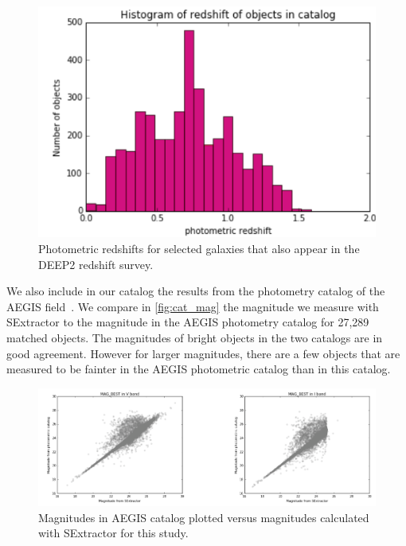 \documentclass[a4paper,11pt]{article}
\begin{document}
\begin{figure}[h]
\centering\includegraphics[width=0.7\linewidth]{redshift.png}
\caption{Photometric redshifts for selected galaxies that also appear in the DEEP2 redshift survey.}
\label{fig:redshift}
\end{figure}
We also include in our catalog the results from the photometry catalog of the AEGIS field~\citep{Lotz2008}. 
We compare in \autoref{fig:cat_mag} the magnitude we measure with SExtractor to the magnitude in the AEGIS photometry catalog for 27,289 matched objects. The magnitudes of bright objects in the two catalogs are in good agreement. However  for larger magnitudes, there are a few objects that are measured to be fainter in the AEGIS photometric catalog than in this catalog.
\begin{figure}[h]
\centering\includegraphics[width=1.\linewidth]{cat_mag.png}
\caption{Magnitudes in AEGIS catalog plotted versus magnitudes calculated with SExtractor for this study.}
\label{fig:cat_mag}
\end{figure}
\end{document}

